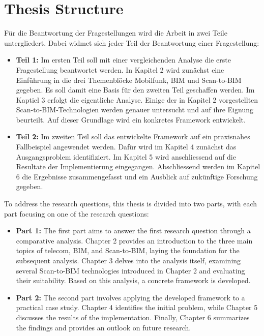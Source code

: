 \section{Thesis Structure}
\begin{German}
    Für die Beantwortung der Fragestellungen wird die Arbeit in zwei Teile untergliedert. Dabei widmet sich jeder Teil der Beantwortung einer Fragestellung:

    \begin{itemize}
        \item \textbf{Teil 1:} Im ersten Teil soll mit einer vergleichenden Analyse die erste Fragestellung beantwortet werden. In Kapitel 2 wird zunächst eine Einführung in die drei Themenblöcke Mobilfunk, BIM und Scan-to-BIM gegeben. Es soll damit eine Basis für den zweiten Teil geschaffen werden. Im Kaptiel 3 erfolgt die eigentliche Analyse. Einige der in Kapitel 2 vorgestellten Scan-to-BIM-Technologien werden genauer untersucht und auf ihre Eignung beurteilt. Auf dieser Grundlage wird ein konkretes Framework entwickelt.
        \item \textbf{Teil 2:} Im zweiten Teil soll das entwickelte Framework auf ein praxisnahes Fallbeispiel angewendet werden. Dafür wird im Kapitel 4 zunächst das Ausgangsproblem identifiziert. Im Kapitel 5 wird anschliessend auf die Resultate der Implementierung eingegangen. Abschliessend werden im Kapitel 6 die Ergebnisse zusammengefasst und ein Ausblick auf zukünftige Forschung gegeben.
    \end{itemize} 
\end{German}

\begin{English}
    To address the research questions, this thesis is divided into two parts, with each part focusing on one of the research questions:

    \begin{itemize}
        \item \textbf{Part 1:} The first part aims to answer the first research question through a comparative analysis. Chapter 2 provides an introduction to the three main topics of telecom, BIM, and Scan-to-BIM, laying the foundation for the subsequent analysis. Chapter 3 delves into the analysis itself, examining several Scan-to-BIM technologies introduced in Chapter 2 and evaluating their suitability. Based on this analysis, a concrete framework is developed.
        \item \textbf{Part 2:} The second part involves applying the developed framework to a practical case study. Chapter 4 identifies the initial problem, while Chapter 5 discusses the results of the implementation. Finally, Chapter 6 summarizes the findings and provides an outlook on future research.
    \end{itemize}
\end{English}
